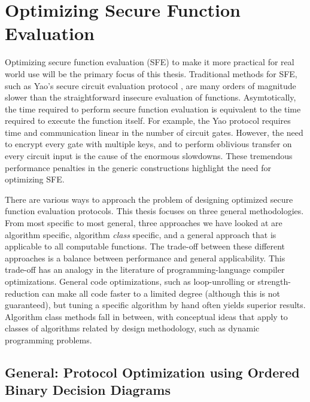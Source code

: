 
\chapter{Optimizing Secure Function Evaluation}

\label{sec:Techniques}

Optimizing secure function evaluation (SFE) to make it more practical for
real world use will be the primary focus of this thesis. Traditional methods
for SFE, such as Yao's secure circuit evaluation protocol \cite{Yao86},
are many orders of magnitude slower than the straightforward insecure
evaluation of functions. Asymtotically,
the time required to perform secure function evaluation is equivalent
to the time required to execute the function itself. For example,
the Yao protocol requires time and communication linear in the number
of circuit gates. However, the need to encrypt every gate with multiple
keys, and to perform oblivious transfer on every circuit input is
the cause of the enormous slowdowns. These tremendous performance
penalties in the generic constructions highlight the need for optimizing
SFE.

There are various ways to approach the problem of designing optimized
secure function evaluation protocols. This thesis focuses on three
general methodologies. From most specific to most general, three approaches
we have looked at are algorithm specific, algorithm \emph{class} specific,
and a general approach that is applicable to all computable functions.
The trade-off between these different approaches is a balance between
performance and general applicability. This trade-off has an analogy
in the literature of programming-language compiler optimizations.
General code optimizations, such as loop-unrolling or strength-reduction
can make all code faster to a limited degree (although this is not
guaranteed), but tuning a specific algorithm by hand often yields
superior results. Algorithm class methods fall in between, with conceptual
ideas that apply to classes of algorithms related by design methodology,
such as dynamic programming problems.


\section{General: Protocol Optimization using Ordered Binary Decision Diagrams}

\label{OBDD-section}

